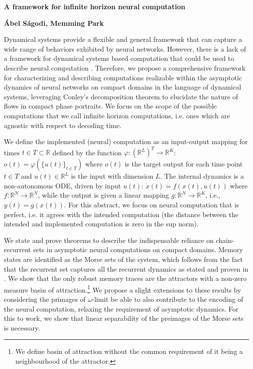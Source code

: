 \documentclass[12pt,letterpaper, onecolumn]{article}
\theoremstyle{definition}
\theoremstyle{remark}
\newcommand{\reals}{\mathbb{R}}
\begin{document}

\begin{center}
\LARGE{\textbf{A framework for infinite horizon neural computation}}
\end{center}
\begin{center}
{\textbf{\'Abel S\'agodi, Memming Park}}
\end{center}

Dynamical systems provide a flexible and general framework that can capture a wide range of behaviors exhibited by neural networks.
However, there is a lack of a framework for dynamical systems based computation that could be used to describe neural computation \cite{jaeger2021}.
Therefore, we propose a comprehensive framework for characterizing and describing computations realizable within the asymptotic dynamics of neural networks on compact domains in the language of dynamical systems, leveraging Conley's decomposition theorem to elucidate the nature of flows in compact phase portraits.
We focus on the scope of the possible computations that we call infinite horizon computations, i.e. ones which are agnostic with respect to decoding time. 

We define the implemented (neural) computation as an input-output mapping for times $t\in T\subset\reals$ defined by the function $\varphi:{(\reals^L)}^T\rightarrow\reals^K$: $o(t) = \varphi(\{u(t)\}_{t\in T})$
where $o(t)$ is the target output for each time point $t\in T$ and  $u(t)\in \reals^L$ is the input with dimension $L$.
The internal dynamics is a non-autonomous ODE, driven by input $u(t)$: $\dot x(t) = f(x(t),u(t))$ where $f:\reals^N\rightarrow\reals^N$,
while the output is given a linear mapping $g:\reals^N\rightarrow\reals^K$, i.e., $y(t) = g(x(t))$.
For this abstract, we focus on neural computation that is perfect, i.e. it agrees with the intended computation (the distance between the intended and implemented computation is zero in the sup norm).
 
We state and prove theorems to describe the indispensable reliance on chain-recurrent sets in asymptotic neural computations on compact domains. Memory states are identified as the Morse sets \cite{mischaikow1999} of the system, which follows from the fact that the recurrent set captures all the recurrent dynamics as stated and proven in \cite[Chapter I.8.2]{conley1978}. We show that the only robust memory traces are the attractors with a non-zero measure basin of attraction.\footnote{We define basin of attraction without the common requirement of it being a neighbourhood of the attractor.}
We propose a slight extensions to these results by considering the primages of $\omega$-limit be able to also contribute to the encoding of the neural computation, relaxing the requirement of asymptotic dynamics. For this to work, we show that linear separability of the preimages of the Morse sets is necessary.
\end{document}
